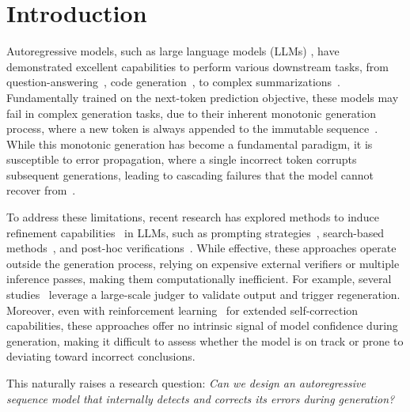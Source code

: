 \section{Introduction}
Autoregressive models, such as large language models (LLMs) \cite{ye2025llms4all}, have demonstrated  excellent capabilities to perform various downstream tasks, from question-answering~\cite{kamalloo2023evaluating,song2025learning,qian2025enhancingllm}, code generation~\cite{chen2021evaluating,ma2025autodata}, to complex summarizations~\cite{zhang2024benchmarking, tang2023evaluating,li2025verification,qian2025enhancing,ma2025llm}.
Fundamentally trained on the next-token prediction objective, these models 
may fail in complex generation tasks, due to their inherent monotonic generation process, where a new token is always appended to the immutable sequence~\cite{bachmann2024pitfalls, thoppilan2022lamda}.
While this monotonic generation has become a fundamental paradigm, it is susceptible to error propagation, where a single incorrect token corrupts subsequent generations, leading to cascading failures that the model cannot recover from~\cite{zhang2023snowball, gan2025rethinking, berglund2023reversal, zhu2024towards}.

To address these limitations, recent research has explored methods to induce refinement capabilities~\cite{lin2023swiftsage} in LLMs, such as prompting strategies~\cite{wei2022chain, zhou2022large}, search-based methods~\cite{yao2023tree, besta2024graph}, and post-hoc verifications~\cite{madaan2023selfrefine, lightman2023let, wang2022self}.
While effective, these approaches operate outside the generation process, relying on expensive external verifiers or multiple inference passes, making them computationally inefficient. 
For example, several studies~\cite{luo2024improve, lightman2023let} leverage a large-scale judger to validate output and trigger regeneration.
Moreover, even with reinforcement learning~\cite{huang2023large, kamalloo2023evaluating, kamoi2024can} for extended self-correction capabilities, these approaches offer no intrinsic signal of model confidence during generation, making it difficult to assess whether the model is on track or prone to deviating toward incorrect conclusions. 

This naturally raises a research question: \textit{Can we design an autoregressive sequence model that internally detects and corrects its errors during generation?}


